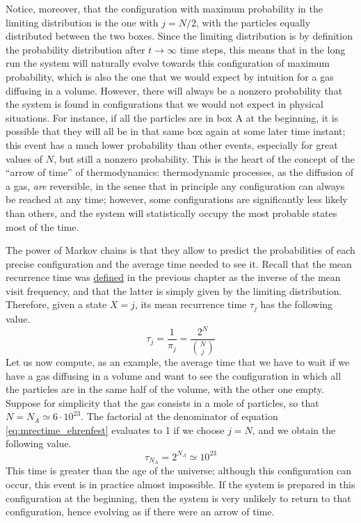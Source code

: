 Notice, moreover, that the configuration with maximum probability in the limiting distribution is the one with $j = N/2$, \ie with the particles equally distributed between the two boxes. Since the limiting distribution is by definition the probability distribution after $t\rightarrow \infty$ time steps, this means that in the long run the system will naturally evolve towards this configuration of maximum probability, which is also the one that we would expect by intuition for a gas diffusing in a volume. However, there will always be a nonzero probability that the system is found in configurations that we would not expect in physical situations. For instance, if all the particles are in box A at the beginning, it is possible that they will all be in that same box again at some later time instant; this event has a much lower probability than other events, especially for great values of $N$, but still a nonzero probability. This is the heart of the concept of the \enquote{arrow of time} of thermodynamics: thermodynamic processes, as the diffusion of a gas, \emph{are} reversible, in the sense that in principle any configuration can always be reached at any time; however, some configurations are significantly less likely than others, and the system will statistically occupy the most probable states most of the time. 

The power of Markov chains is that they allow to predict the probabilities of each precise configuration and the average time needed to see it. Recall that the mean recurrence time was \hyperref[def:mean_rec_time] {defined} in the previous chapter as the inverse of the mean visit frequency, and that the latter is simply given by the limiting distribution. Therefore, given a state $X = j$, its mean recurrence time $\tau_j$ has the following value.
\begin{equation} \label{eq:mrectime_ehrenfest}
    \tau_j = \frac{1}{\pi_j} = \frac{2^N}{{{N} \choose {j}}} 
\end{equation}
Let us now compute, as an example, the average time that we have to wait if we have a gas diffusing in a volume and want to see the configuration in which all the particles are in the same half of the volume, with the other one empty. Suppose for simplicity that the gas consists in a mole of particles, so that $N = N_A \simeq 6\cdot 10^{23}$. The factorial at the denominator of equation \ref{eq:mrectime_ehrenfest} evaluates to 1 if we choose $j = N$, and we obtain the following value.
\begin{equation}
    \tau_{N_A} = 2^{N_A} \simeq 10^{23}
\end{equation}
This time is greater than the age of the universe; although this configuration can occur, this event is in practice almost impossible. If the system is prepared in this configuration at the beginning, then the system is very unlikely to return to that configuration, hence evolving as if there were an arrow of time.